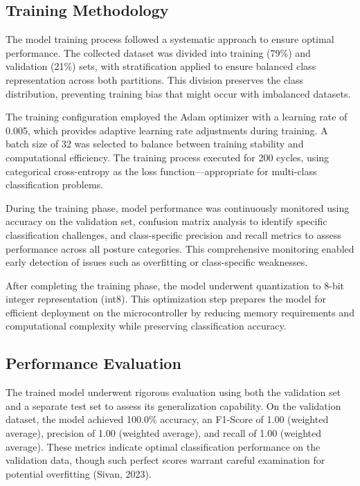 \documentclass[
  9pt,
  letterpaper,
  abstract,
  titlepage]{scrbook}
\begin{document}
\subsection{Training Methodology}\label{training-methodology}

The model training process followed a systematic approach to ensure
optimal performance. The collected dataset was divided into training
(79\%) and validation (21\%) sets, with stratification applied to ensure
balanced class representation across both partitions. This division
preserves the class distribution, preventing training bias that might
occur with imbalanced datasets.

The training configuration employed the Adam optimizer with a learning
rate of 0.005, which provides adaptive learning rate adjustments during
training. A batch size of 32 was selected to balance between training
stability and computational efficiency. The training process executed
for 200 cycles, using categorical cross-entropy as the loss
function---appropriate for multi-class classification problems.

During the training phase, model performance was continuously monitored
using accuracy on the validation set, confusion matrix analysis to
identify specific classification challenges, and class-specific
precision and recall metrics to assess performance across all posture
categories. This comprehensive monitoring enabled early detection of
issues such as overfitting or class-specific weaknesses.

After completing the training phase, the model underwent quantization to
8-bit integer representation (int8). This optimization step prepares the
model for efficient deployment on the microcontroller by reducing memory
requirements and computational complexity while preserving
classification accuracy.

\subsection{Performance Evaluation}\label{performance-evaluation}

The trained model underwent rigorous evaluation using both the
validation set and a separate test set to assess its generalization
capability. On the validation dataset, the model achieved 100.0\%
accuracy, an F1-Score of 1.00 (weighted average), precision of 1.00
(weighted average), and recall of 1.00 (weighted average). These metrics
indicate optimal classification performance on the validation data,
though such perfect scores warrant careful examination for potential
overfitting (Sivan, 2023).
\end{document}
